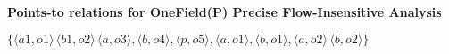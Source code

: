 \documentclass[12pt]{article}
\begin{document}
\begin{enumerate}
\begin{mdframed}
        \textbf{Points-to relations for OneField(P) Precise Flow-Insensitive Analysis}

        $\{\langle a1, o1 \rangle\, \langle b1, o2 \rangle\, \langle a, o3 \rangle, \langle b, o4 \rangle, \langle p, o5 \rangle, \langle a, o1 \rangle, \langle b, o1 \rangle, \langle a, o2 \rangle \, \langle b, o2 \rangle \}$
  \end{mdframed}

\end{enumerate}
    
\end{document}
